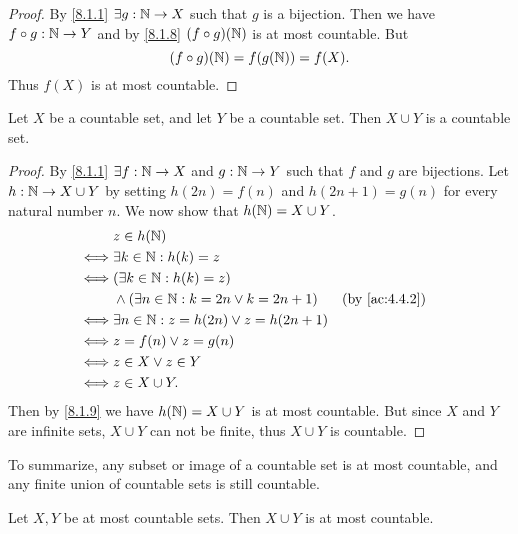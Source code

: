 \begin{proof}
	By \cref{8.1.1} \(\exists g : \mathbb{N} \to X\) such that \(g\) is a bijection.
	Then we have \(f \circ g : \mathbb{N} \to Y\) and by \cref{8.1.8} \((f \circ g)(\mathbb{N})\) is at most countable.
	But
	\[
		(f \circ g)(\mathbb{N}) = f(g(\mathbb{N})) = f(X).
	\]
	Thus \(f(X)\) is at most countable.
\end{proof}

\begin{prop}\label{8.1.10}
	Let \(X\) be a countable set, and let \(Y\) be a countable set.
	Then \(X \cup Y\) is a countable set.
\end{prop}

\begin{proof}
	By \cref{8.1.1} \(\exists f : \mathbb{N} \to X\) and \(g : \mathbb{N} \to Y\) such that \(f\) and \(g\) are bijections.
	Let \(h : \mathbb{N} \to X \cup Y\) by setting \(h(2n) = f(n)\) and \(h(2n + 1) = g(n)\) for every natural number \(n\).
	We now show that \(h(\mathbb{N}) = X \cup Y\).
	\begin{align*}
		     & z \in h(\N)                                                          \\
		\iff & \exists k \in \N : h(k) = z                                          \\
		\iff & (\exists k \in \N : h(k) = z)                                        \\
		     & \land (\exists n \in \N : k = 2n \lor k = 2n + 1) &  & \by{ac:4.4.2} \\
		\iff & \exists n \in \N : z = h(2n) \lor z = h(2n + 1)                      \\
		\iff & z = f(n) \lor z = g(n)                                               \\
		\iff & z \in X \lor z \in Y                                                 \\
		\iff & z \in X \cup Y.
	\end{align*}
	Then by \cref{8.1.9} we have \(h(\mathbb{N}) = X \cup Y\) is at most countable.
	But since \(X\) and \(Y\) are infinite sets, \(X \cup Y\) can not be finite, thus \(X \cup Y\) is countable.
\end{proof}

\begin{note}
	To summarize, any subset or image of a countable set is at most countable, and any finite union of countable sets is still countable.
\end{note}

\begin{ac}\label{ac:8.1.1}
	Let \(X, Y\) be at most countable sets.
	Then \(X \cup Y\) is at most countable.
\end{ac}

